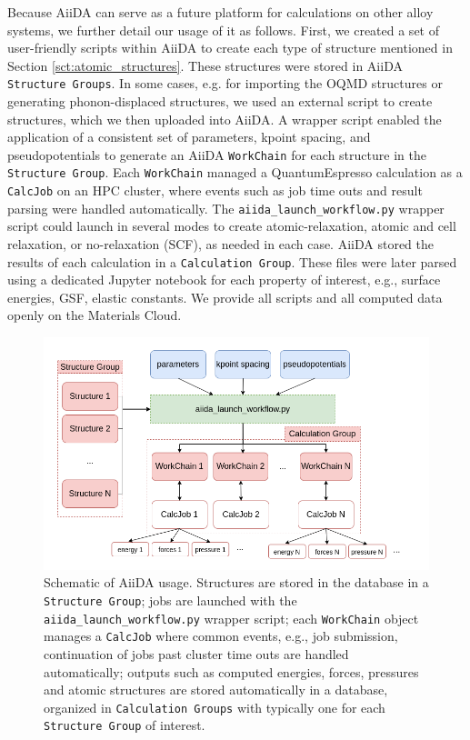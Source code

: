 \documentclass{article}
\begin{document}
Because AiiDA can serve as a future platform for calculations on other alloy systems, we further detail our usage of it as follows.
First, we created a set of user-friendly scripts within AiiDA to create each type of structure mentioned in Section \ref{sct:atomic_structures}.
These structures were stored in AiiDA \texttt{Structure Groups}.
In some cases, e.g. for importing the OQMD structures or generating phonon-displaced structures, we used an external script to create structures, which we then uploaded into AiiDA.
A wrapper script enabled the application of a consistent set of parameters, kpoint spacing, and pseudopotentials to generate an AiiDA \texttt{WorkChain} for each structure in the \texttt{Structure Group}.
Each \texttt{WorkChain} managed a QuantumEspresso calculation as a \texttt{CalcJob} on an HPC cluster, 
where events such as job time outs and result parsing were handled automatically.
The \texttt{aiida_launch_workflow.py} wrapper script could launch in several modes to create atomic-relaxation, atomic and cell relaxation, or no-relaxation (SCF), as needed in each case.
AiiDA stored the results of each calculation in a \texttt{Calculation Group}.  These files were later parsed using a dedicated Jupyter\cite{Kluyver2016} notebook for each property of interest, e.g., surface energies, GSF, elastic constants. 
We provide all scripts and all computed data openly on the Materials Cloud\cite{Talirz2020MaterialsScience, Marchand2020SupplementaryData}.


\begin{figure}[H]%
\centering%
\includegraphics[width=1.0\textwidth,center]{figures/recalculateDBschematic.png}%
\caption{Schematic of AiiDA usage.  Structures are stored in the database in a \lstinline{Structure Group}; jobs are launched with the \lstinline{aiida_launch_workflow.py} wrapper script; each \lstinline{WorkChain} object manages a \lstinline{CalcJob} where common events, e.g., job submission, continuation of jobs past cluster time outs are handled automatically; outputs such as computed energies, forces, pressures and atomic structures are stored automatically in a database, organized in \lstinline{Calculation Groups} with typically one
for each \lstinline{Structure Group} of interest.
}
\label{fig:aiida_methods}
\end{figure}
\end{document}
